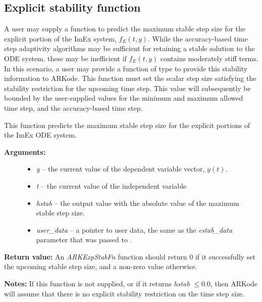 \documentclass[letterpaper,10pt,english]{sphinxmanual}
\begin{document}
\subsection{Explicit stability function}
\label{c_interface/User_supplied:explicit-stability-function}\label{c_interface/User_supplied:cinterface-stabilityfn}
A user may supply a function to predict the maximum stable step size
for the explicit portion of the ImEx system, \(f_E(t,y)\).  While
the accuracy-based time step adaptivity algorithms may be sufficient
for retaining a stable solution to the ODE system, these may be
inefficient if \(f_E(t,y)\) contains moderately stiff terms.  In
this scenario, a user may provide a function of type {\hyperref[c_interface/User_supplied:c.ARKExpStabFn]{\emph{}}}
to provide this stability information to ARKode.  This function
must set the scalar step size satisfying the stability restriction for
the upcoming time step.  This value will subsequently be bounded by
the user-supplied values for the minimum and maximum allowed time
step, and the accuracy-based time step.

\begin{fulllineitems}
\label{c_interface/User_supplied:c.ARKExpStabFn}
This function predicts the maximum stable step size for the
explicit portions of the ImEx ODE system.
\begin{description}
\item[{\textbf{Arguments:}}] \leavevmode\begin{itemize}
\item {} 
\emph{y} -- the current value of the dependent variable vector, \(y(t)\).

\item {} 
\emph{t} -- the current value of the independent variable

\item {} 
\emph{hstab} -- the output value with the absolute value of the
maximum stable step size.

\item {} 
\emph{user\_data} -- a pointer to user data, the same as the
\emph{estab\_data} parameter that was passed to {\hyperref[c_interface/User_callable:c.ARKodeSetStabilityFn]{\emph{}}}.

\end{itemize}

\end{description}

\textbf{Return value:}
An \emph{ARKExpStabFn} function should return 0 if it
successfully set the upcoming stable step size, and a non-zero
value otherwise.

\textbf{Notes:}  If this function is not supplied, or if it returns
\emph{hstab} \(\le 0.0\), then ARKode will assume that there is no explicit
stability restriction on the time step size.

\end{fulllineitems}
\end{document}
